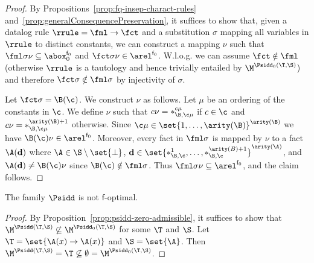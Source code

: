 \begin{proof}
  By Propositions~\ref{prop:fq-insep-charact-rules}
  and~\ref{prop:generalConsequencePreservation}, it suffices to show
  that, given a datalog rule $\rrule=\fml\to\fct$ and a substitution
  $\sigma$ mapping all variables in $\rrule$ to distinct constants, we
  can construct a mapping $\nu$ such that
  $\fml\sigma\nu\subseteq\abox_0^{\mathsf{f}_0}$ and
  $\fct\sigma\nu\in\arel^{\mathsf{f}_0}$. W.l.o.g. we can assume
  $\fct\notin\fml$ (otherwise $\rrule$ is a tautology and hence
  trivially entailed by $\M^{\Psidd_0(\T,\S)}$) and therefore
  $\fct\sigma\notin\fml\sigma$ by injectivity of $\sigma$.

  Let $\fct\sigma=\B(\c)$. We construct $\nu$ as follows. Let $\mu$ be
  an ordering of the constants in $\c$. We define $\nu$ such that
  $c\nu=*_{\B,\c\mu}^{c\mu}$ if $c\in\c$ and
  $c\nu=*_{\B,\c\mu}^{\arity(\B)+1}$ otherwise. Since
  $\c\mu\in\set{1,\dots,\arity(\B)}^{\arity(\B)}$ we have
  $\B(\c)\nu\in\arel^{\mathsf{f}_0}$. Moreover, every fact in
  $\fml\sigma$ is mapped by $\nu$ to a fact $\A(\mathbf{d})$ where
  $\A\in\S\setminus\set{\bot}$,
  $\mathbf{d}\in\set{*_{\B,\c}^1,\dots,*_{\B,\c}^{\arity(B)+1}}^{\arity(\A)}$,
  and $\A(\mathbf{d})\neq \B(\c)\nu$ since $\B(\c)\notin\fml\sigma$.
  Thus $\fml\sigma\nu\subseteq\arel^{\mathsf{f}_0}$, and the claim
  follows.
\end{proof}

\begin{proposition}
  The family $\Psidd$ is not $\mathsf{f}$-optimal.
\end{proposition}

\begin{proof}
  By Proposition~\ref{prop:psidd-zero-admissible}, it suffices to show
  that $\M^{\Psidd(\T,\S)}\not\subseteq\M^{\Psidd_0(\T,\S)}$ for some
  $\T$ and $\S$. Let $\T=\set{\A(x)\to\A(x)}$ and $\S=\set{\A}$. Then
  $\M^{\Psidd(\T,\S)}=\T\not\subseteq\emptyset=\M^{\Psidd_0(\T,\S)}$.
\end{proof}
